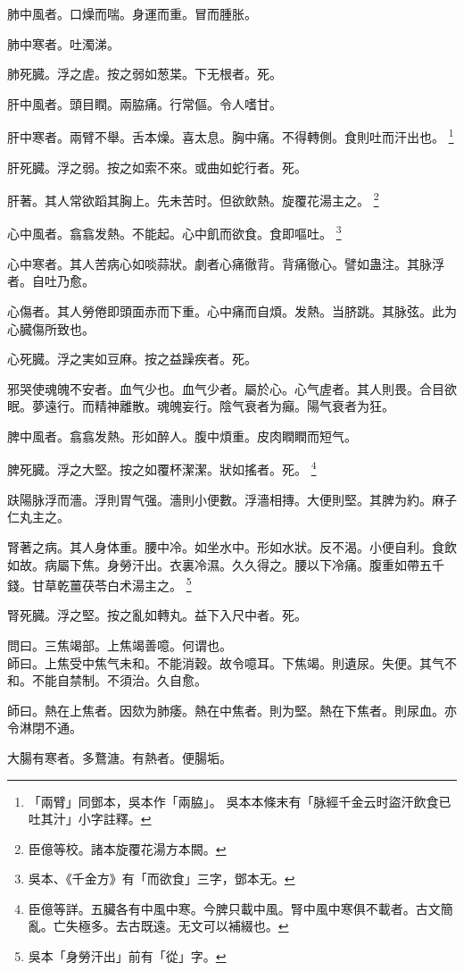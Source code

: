 肺中風者。口燥而喘。身運而重。冒而腫胀。

肺中寒者。吐濁涕。

肺死臓。浮之虗。按之弱如葱枼。下无根者。死。

肝中風者。頭目瞤。兩脇痛。行常傴。令人嗜甘。

肝中寒者。兩臂不舉。舌本燥。喜太息。胸中痛。不得轉側。食則吐而汗出也。
	\footnote{
		「兩臂」同鄧本，吳本作「兩脇」。
		吳本本條末有「脉經千金云时盜汗飲食已吐其汁」小字註釋。
	}

肝死臓。浮之弱。按之如索不來。或曲如蛇行者。死。

肝著。其人常欲蹈其胸上。先未苦时。但欲飲熱。旋覆花湯主之。
	\footnote{
		臣億等校。諸本旋覆花湯方本闕。
	}

心中風者。翕翕发熱。不能起。心中飢而欲食。食即嘔吐。
	\footnote{
		吳本、《千金方》有「而欲食」三字，鄧本无。
	}

心中寒者。其人苦病心如啖蒜狀。劇者心痛徹背。背痛徹心。譬如蛊注。其脉浮者。自吐乃愈。

心傷者。其人勞倦即頭面赤而下重。心中痛而自煩。发熱。当脐跳。其脉弦。此为心臓傷所致也。

心死臓。浮之実如豆麻。按之益躁疾者。死。

邪哭使魂魄不安者。血气少也。血气少者。屬於心。心气虗者。其人則畏。合目欲眠。夢遠行。而精神離散。魂魄妄行。陰气衰者为癲。陽气衰者为狂。

脾中風者。翕翕发熱。形如醉人。腹中煩重。皮肉瞤瞤而短气。

脾死臓。浮之大堅。按之如覆杯潔潔。狀如搖者。死。
	\footnote{
		臣億等詳。五臟各有中風中寒。今脾只載中風。腎中風中寒俱不載者。古文簡亂。亡失極多。去古既遠。无文可以補綴也。
	}

趺陽脉浮而濇。浮則胃气强。濇則小便數。浮濇相摶。大便則堅。其脾为約。麻子仁丸主之。

腎著之病。其人身体重。腰中冷。如坐水中。形如水狀。反不渴。小便自利。食飲如故。病屬下焦。身勞汗出。衣裏冷濕。久久得之。腰以下冷痛。腹重如帶五千錢。甘草乾薑茯苓白术湯主之。
	\footnote{
		吳本「身勞汗出」前有「從」字。
	}

腎死臓。浮之堅。按之亂如轉丸。益下入尺中者。死。

問曰。三焦竭部。上焦竭善噫。何谓也。\\
師曰。上焦受中焦气未和。不能消穀。故令噫耳。下焦竭。則遺尿。失便。其气不和。不能自禁制。不須治。久自愈。

師曰。熱在上焦者。因欬为肺痿。熱在中焦者。則为堅。熱在下焦者。則尿血。亦令淋閉不通。

大腸有寒者。多鶩溏。有熱者。便腸垢。

